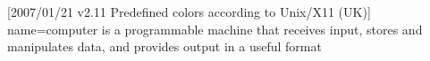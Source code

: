 [2007/01/21 v2.11 Predefined colors according to Unix/X11 (UK)]
{
  name=computer
}
  {is a programmable machine that receives input,
               stores and manipulates data, and provides
               output in a useful format}
